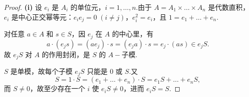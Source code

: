 \begin{proof}
\noindent \textbf{(i)} 设 $e_i$ 是 $A_i$ 的单位元，$i = 1, \dots, n$.由于 $A = A_1 \times \dots \times A_n$ 是代数直积，$e_i$ 是中心正交幂等元：$e_i e_j = 0\;(i \neq j)$，$e_i^2 = e_i$，且 $1 = e_1 + \dots + e_n$.\par
\noindent{} 对任意 $a \in A$ 和 $s \in S$，因 $e_j$ 在 $A$ 的中心里，有
\[
a \cdot (e_j s) = (a e_j) \cdot s = (e_j a) \cdot s = e_j \cdot (a s) \in e_j S.
\]
故 $e_j S$ 对 $A$ 的作用封闭，是 $S$ 的 $A-\!\!$子模.\par
\noindent {} $S$ 是单模，故每个子模 $e_j S$ 只能是 $0$ 或 $S$.又
\[
S = 1 \cdot S = (e_1 + \dots + e_n) \cdot S = e_1 S + \dots + e_n S,
\]
而 $S \neq 0$，故至少存在一个 $i$ 使 $e_i S \neq 0$，进而 $e_i S = S$.


\end{proof}
